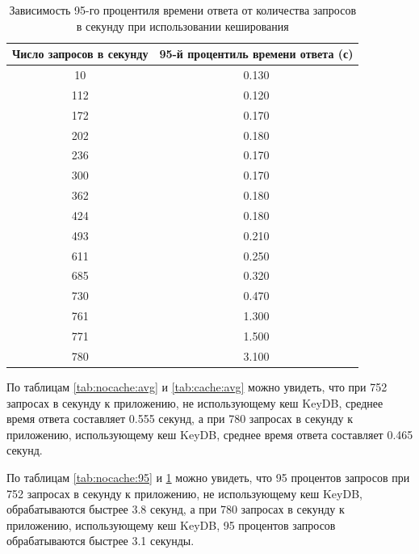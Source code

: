 \begin{table}[H]
\centering
\caption{Зависимость 95-го процентиля времени ответа от количества запросов в секунду при использовании кеширования}
\begin{tabular}{|c|c|}
\hline
    \textbf{Число запросов в секунду} & \textbf{95-й процентиль времени ответа (с)} \\ \hline
     10 & 0.130 \\ \hline             
    112 & 0.120 \\ \hline             
    172 & 0.170 \\ \hline             
    202 & 0.180 \\ \hline             
    236 & 0.170 \\ \hline             
    300 & 0.170 \\ \hline             
    362 & 0.180 \\ \hline             
    424 & 0.180 \\ \hline             
    493 & 0.210 \\ \hline             
    611 & 0.250 \\ \hline             
    685 & 0.320 \\ \hline             
    730 & 0.470 \\ \hline             
    761 & 1.300 \\ \hline             
    771 & 1.500 \\ \hline             
    780 & 3.100 \\ \hline             
\end{tabular}
\label{tab:cache:95}
\end{table}

По таблицам \ref{tab:nocache:avg} и \ref{tab:cache:avg} можно увидеть, что при 752 запросах в секунду к приложению, не использующему кеш KeyDB, среднее время ответа составляет 0.555 секунд, а при 780 запросах в секунду к приложению, использующему кеш KeyDB, среднее время ответа составляет 0.465 секунд.

По таблицам \ref{tab:nocache:95} и \ref{tab:cache:95} можно увидеть, что 95 процентов запросов при 752 запросах в секунду к приложению, не использующему кеш KeyDB, обрабатываются быстрее 3.8 секунд, а при 780 запросах в секунду к приложению, использующему кеш KeyDB, 95 процентов запросов обрабатываются быстрее 3.1 секунды.

